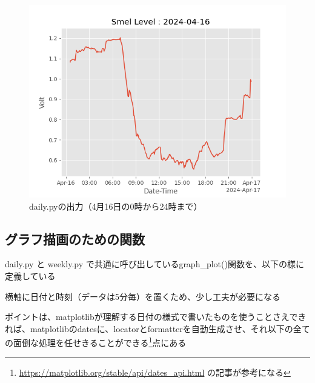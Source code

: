 \documentclass[12pt,a4paper,uplatex]{jsbook}
\begin{document}
\begin{figure}[htbp]
	\begin{minipage}[b]{1.0\linewidth}
		\centering
		\includegraphics[keepaspectratio, scale=0.8]{figs/png/2024-04-16.png}
		\caption{daily.pyの出力（4月16日の0時から24時まで）}
	\end{minipage}
\end{figure}

\subsection{グラフ描画のための関数}

daily.py と weekly.py で共通に呼び出しているgraph\_plot()関数を、以下の様に定義している

横軸に日付と時刻（データは5分毎）を置くため、少し工夫が必要になる

ポイントは、matplotlibが理解する日付の様式で書いたものを使うことさえできれば、matplotlibのdatesに、locatorとformatterを自動生成させ、それ以下の全ての面倒な処理を任せきることができる\footnote{\url{https://matplotlib.org/stable/api/dates_api.html}
	の記事が参考になる}点にある
\end{document}
